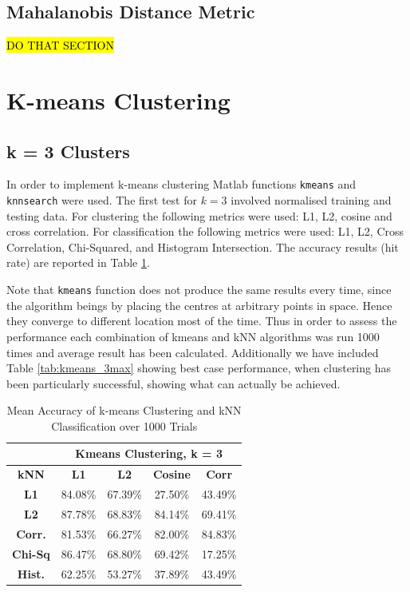 \documentclass[10pt,twocolumn,letterpaper]{article}
\begin{document}
\subsection{Mahalanobis Distance Metric}

\hl{DO THAT SECTION}

\section{K-means Clustering}
\subsection{k = 3 Clusters}
In order to implement k-means clustering Matlab functions {\tt\small kmeans} and {\tt\small knnsearch} were used. The first test for $k=3$ involved normalised training and testing data. For clustering the following metrics were used: L1, L2, cosine and cross correlation.
For classification the following metrics were used: L1, L2, Cross Correlation, Chi-Squared, and Histogram Intersection. The accuracy results (hit rate) are reported in Table \ref{tab:kmeans3}.

Note that {\tt\small kmeans} function does not produce the same results every time, since the algorithm beings by placing the centres at arbitrary points in space. Hence they converge to different location most of the time. Thus in order to assess the performance each combination of kmeans and kNN algorithms was run 1000 times and average result has been calculated. Additionally we have included Table \ref{tab:kmeans_3max} showing best case performance, when clustering has been particularly successful, showing what can actually be achieved.

\vspace{2mm}

\begin{table}[H]
\caption{Mean Accuracy of k-means Clustering and kNN Classification over 1000 Trials \label{tab:kmeans3}}
\small
\begin{center}
\begin{tabular}{|c| c c c c|}
\cline{2-5}
\multicolumn{1}{c|}{ } & \multicolumn{4}{|c|}{\bf Kmeans Clustering, k = 3} \\
\hline

\bf kNN &\bf L1 &\bf L2 &\bf Cosine &\bf Corr \\ [0.5ex]
\hline
\bf L1 & 84.08\% & 67.39\%  & 27.50\% & 43.49\%\\ [0.5ex]
\hline
\bf L2 & 87.78\% & 68.83\%  & 84.14\% & 69.41\%\\ [0.5ex]
\hline
\bf Corr. & 81.53\% & 66.27\%  & 82.00\% & 84.83\%\\ [0.5ex]
\hline
\bf Chi-Sq & 86.47\% & 68.80\%  & 69.42\% & 17.25\%\\ [0.5ex]
\hline
\bf Hist. & 62.25\% & 53.27\%  & 37.89\% & 43.49\%\\ [0.5ex]
\hline
\end{tabular}
\end{center}
\end{table}
\end{document}
